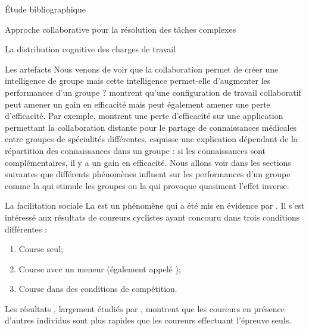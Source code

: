 \documentclass[myfrancais,ngerman,english,french]{mythesis}
\begin{document}
\begin{mychapter}{Étude bibliographique}
\begin{mysection}{Approche collaborative pour la résolution des tâches complexes}
\begin{mysubsection}{La distribution cognitive des charges de travail}
\begin{mysubsubsection}{Les artefacts}
					Nous venons de voir que la collaboration permet de créer une intelligence de groupe mais cette intelligence permet-elle d'augmenter les performances d'un groupe ?
					 montrent qu'une configuration de travail collaboratif peut amener un gain en efficacité mais peut également amener une perte d'efficacité.
					Par exemple,  montrent une perte d'efficacité sur une application permettant la collaboration distante pour le partage de connaissances médicales entre groupes de spécialités différentes.
					 esquisse une explication dépendant de la répartition des connaissances dans un groupe : si les connaissances sont complémentaires, il y a un gain en efficacité.
					Nous allons voir dans les sections suivantes que différents phénomènes influent sur les performances d'un groupe comme la  qui stimule les groupes ou la  qui provoque quasiment l'effet inverse.
				\end{mysubsubsection}
			\end{mysubsection}
			\begin{mysubsection}{La facilitation sociale}
				La  est un phénomène qui a été mis en évidence par .
				Il s'est intéressé aux résultats de coureurs cyclistes ayant concouru dans trois conditions différentes :
				\begin{enumerate}
					\item Course seul;
					\item Course avec un meneur (également appelé );
					\item Course dans des conditions de compétition.
				\end{enumerate}
				Les résultats , largement étudiés par , montrent que les coureurs en présence d'autres individus sont plus rapides que les coureurs effectuant l'épreuve seuls.


\end{mysubsection}
\end{mysection}
\end{mychapter}
\end{document}

